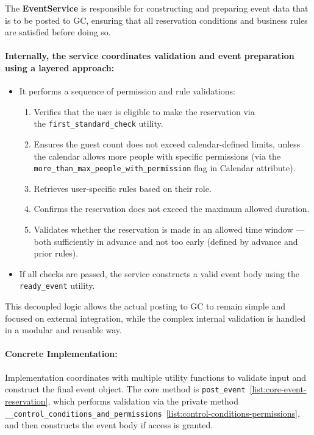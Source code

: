 The \textbf{EventService} is responsible for constructing and preparing event data that is to be posted to GC, ensuring that all reservation conditions and business rules are satisfied before doing so.

\paragraph{Internally, the service coordinates validation and event preparation using a layered approach:}

\begin{itemize}
  \item It performs a sequence of permission and rule validations:
    \begin{enumerate}
      \item Verifies that the user is eligible to make the reservation via\\ the \texttt{first\_standard\_check} utility.
      \item Ensures the guest count does not exceed calendar-defined limits, unless the calendar allows more people with specific permissions (via the \texttt{more\_than\_max\_people\_with\_permission} flag in Calendar attribute).
      \item Retrieves user-specific rules based on their role.
      \item Confirms the reservation does not exceed the maximum allowed duration.
      \item Validates whether the reservation is made in an allowed time window — both sufficiently in advance and not too early (defined by advance and prior rules).
    \end{enumerate}
  \item If all checks are passed, the service constructs a valid event body using the \texttt{ready\_event} utility.
\end{itemize}

This decoupled logic allows the actual posting to GC to remain simple and focused on external integration, while the complex internal validation is handled in a modular and reusable way.

\paragraph{Concrete Implementation:}
Implementation coordinates with multiple utility functions to validate input and construct the final event object. The core method is \texttt{post\_event}~\ref{list:core-event-reservation}, which performs validation via the private method \texttt{\_\_control\_conditions\_and\_permissions}~\ref{list:control-conditions-permissions}, and then constructs the event body if access is granted.


